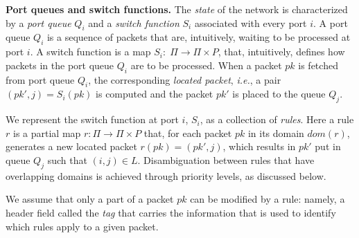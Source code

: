 \documentclass[11pt,pdftex,letter]{article}
\newcommand{\dom}{\textit{dom}}
\newcommand{\ie}{{\it i.e.}}
\newcommand{\mcnote}[1]{\textcolor{heraldBlue}{\small \bf [MC: #1]}}
\newcommand{\mcnote}[1]{}
\begin{document}
\vspace{1mm}\noindent\textbf{Port queues and switch functions.}
The \emph{state} of the network is characterized by a \emph{port
  queue} $Q_i$ and a \emph{switch function} $S_i$ associated with
every port $i$.
A port queue $Q_i$ is a sequence of packets that are, intuitively, waiting to be processed at port $i$.
A switch function is a map $S_i:\;\Pi\rightarrow \Pi\times P$,
that, intuitively, defines how packets in
the port queue $Q_i$ are to be processed.
When a packet $\textit{pk}$ is fetched from port queue $Q_i$, the corresponding \emph{located
  packet}, \ie, a pair $(\textit{pk}',j)=S_i(\textit{pk})$ is computed
and the packet $\textit{pk}'$ is placed to the queue $Q_j$.

We represent the switch function at port $i$, $S_i$, as a collection of
\emph{rules}. Here a rule $r$ is a partial map $r:\Pi\rightarrow \Pi\times P$
that, for each packet $pk$ in its domain $\textit{dom}(r)$, generates a new
located packet $r(pk)=(pk',j)$, which results in $pk'$ put in queue $Q_j$ such
that $(i,j)\in L$. Disambiguation between rules that have overlapping domains
is achieved through priority levels, as discussed below.
%


We assume that only a part of a packet $pk$ can be modified by a rule: namely,
a header field called the \emph{tag} that carries the information that is used
to identify which rules apply to a given packet.
\end{document}
